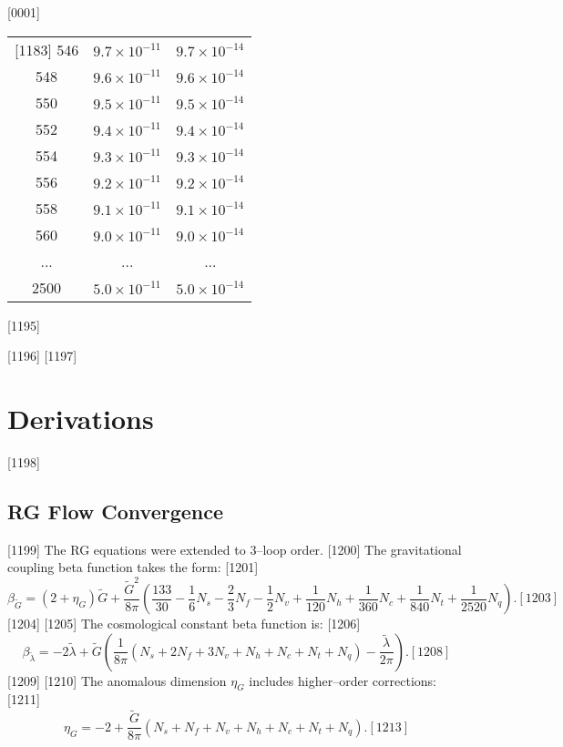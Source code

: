 [0001] \documentclass[12pt]{report}
[0002] \usepackage[utf8]{inputenc}
\begin{document}
\begin{table}[h]
\begin{tabular}{c c c}
[1183] 546 & $9.7 \times 10^{-11}$ & $9.7 \times 10^{-14}$ \\
[1184] 548 & $9.6 \times 10^{-11}$ & $9.6 \times 10^{-14}$ \\
[1185] 550 & $9.5 \times 10^{-11}$ & $9.5 \times 10^{-14}$ \\
[1186] 552 & $9.4 \times 10^{-11}$ & $9.4 \times 10^{-14}$ \\
[1187] 554 & $9.3 \times 10^{-11}$ & $9.3 \times 10^{-14}$ \\
[1188] 556 & $9.2 \times 10^{-11}$ & $9.2 \times 10^{-14}$ \\
[1189] 558 & $9.1 \times 10^{-11}$ & $9.1 \times 10^{-14}$ \\
[1190] 560 & $9.0 \times 10^{-11}$ & $9.0 \times 10^{-14}$ \\
[1191] ... & ... & ... \\
[1192] 2500 & $5.0 \times 10^{-11}$ & $5.0 \times 10^{-14}$ \\
[1193] \bottomrule
[1194] \end{tabular}
[1195] \end{table}
[1196] 
[1197] \chapter{Derivations}
[1198] \section{RG Flow Convergence}
[1199] The RG equations were extended to 3–loop order.  
[1200] The gravitational coupling beta function takes the form:  
[1201] \begin{equation}
[1202] \beta_{\tilde{G}} = (2 + \eta_G) \tilde{G} + \frac{\tilde{G}^2}{8\pi} 
\left( \frac{133}{30} - \frac{1}{6} N_s - \frac{2}{3} N_f - \frac{1}{2} N_v 
+ \frac{1}{120} N_h + \frac{1}{360} N_c + \frac{1}{840} N_t + \frac{1}{2520} N_q \right).  
[1203] \end{equation}
[1204] 
[1205] The cosmological constant beta function is:  
[1206] \begin{equation}
[1207] \beta_{\tilde{\lambda}} = -2 \tilde{\lambda} + \tilde{G} \left( \frac{1}{8\pi} 
(N_s + 2 N_f + 3 N_v + N_h + N_c + N_t + N_q) - \frac{\tilde{\lambda}}{2\pi} \right).  
[1208] \end{equation}
[1209] 
[1210] The anomalous dimension $\eta_G$ includes higher–order corrections:  
[1211] \begin{equation}
[1212] \eta_G = -2 + \frac{\tilde{G}}{8\pi} (N_s + N_f + N_v + N_h + N_c + N_t + N_q).  
[1213] \end{equation}
\end{document}
